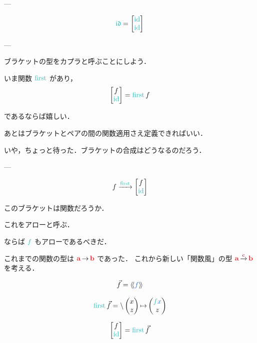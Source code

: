 \documentclass[a5paper,twoside,fleqn,draft]{jsbook}
\begin{document}
---

\begin{equation}
  \mIdCat
  =
  \begin{bmatrix}
    \mId\\
    \mId
  \end{bmatrix}
\end{equation}

---

ブラケットの型をカプラと呼ぶことにしよう．

いま関数 $\mFirst$ があり，
\begin{equation}
  \begin{bmatrix}
    f\\
    \mId
  \end{bmatrix}
  =\mFirst f
\end{equation}


であるならば嬉しい．

あとはブラケットとペアの間の関数適用さえ定義できればいい．

いや，ちょっと待った．ブラケットの合成はどうなるのだろう．

---

\begin{equation}
  f
  \xrightarrow{\mFirst}
  \begin{bmatrix}
    f\\
    \mId
  \end{bmatrix}
\end{equation}

このブラケットは関数だろうか．

これをアローと呼ぶ．

ならば $\hFunc{f}$ もアローであるべきだ．

これまでの関数の型は $\hTypeName{a}\hFunctionArrow\hTypeName{b}$ であった．
これから新しい「関数風」の型 $\hTypeName{a}\mCatArrowC\hTypeName{b}$ を考える．

\begin{equation}
  \Vec{f}
  =\mArrowWith{f}
\end{equation}

\begin{equation}
  \mFirst\Vec{f}
  =\mLambda{\hPairWith{x}{z}}\mLambdaArrow\hPairWith{\hFunc{f}\hVar{x}}{z}
\end{equation}

\begin{equation}
  \begin{bmatrix}
    f\\
    \mId
  \end{bmatrix}
  =\mFirst\Vec{f}
\end{equation}
\end{document}

